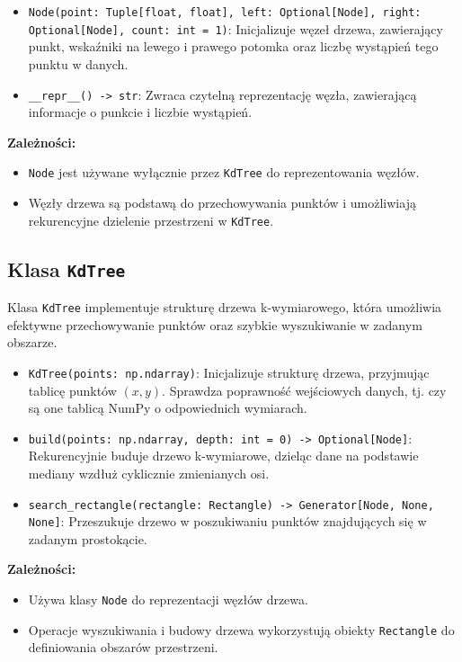 \documentclass[12pt]{article}
\begin{document}
\begin{itemize}
    \item \texttt{Node(point: Tuple[float, float], left: Optional[Node], right: Optional[Node], count: int = 1)}: 
    Inicjalizuje węzeł drzewa, zawierający punkt, wskaźniki na lewego i prawego potomka oraz liczbę wystąpień tego punktu w danych.
    \item \texttt{\_\_repr\_\_() -> str}: 
    Zwraca czytelną reprezentację węzła, zawierającą informacje o punkcie i liczbie wystąpień.
\end{itemize}

\textbf{Zależności:}
\begin{itemize}
    \item \texttt{Node} jest używane wyłącznie przez \texttt{KdTree} do reprezentowania węzłów.
    \item Węzły drzewa są podstawą do przechowywania punktów i umożliwiają rekurencyjne dzielenie przestrzeni w \texttt{KdTree}.
\end{itemize}

\subsection{Klasa \texttt{KdTree}}
Klasa \texttt{KdTree} implementuje strukturę drzewa k-wymiarowego, która umożliwia efektywne przechowywanie punktów oraz szybkie wyszukiwanie w zadanym obszarze.

\begin{itemize}
    \item \texttt{KdTree(points: np.ndarray)}: 
    Inicjalizuje strukturę drzewa, przyjmując tablicę punktów \( (x, y) \). Sprawdza poprawność wejściowych danych, tj. czy są one tablicą NumPy o odpowiednich wymiarach.
    \item \texttt{build(points: np.ndarray, depth: int = 0) -> Optional[Node]}: 
    Rekurencyjnie buduje drzewo k-wymiarowe, dzieląc dane na podstawie mediany wzdłuż cyklicznie zmienianych osi.
    \item \texttt{search\_rectangle(rectangle: Rectangle) -> Generator[Node, None, None]}: 
    Przeszukuje drzewo w poszukiwaniu punktów znajdujących się w zadanym prostokącie.
\end{itemize}

\textbf{Zależności:}
\begin{itemize}
    \item Używa klasy \texttt{Node} do reprezentacji węzłów drzewa.
    \item Operacje wyszukiwania i budowy drzewa wykorzystują obiekty \texttt{Rectangle} do definiowania obszarów przestrzeni.
\end{itemize}
\end{document}
